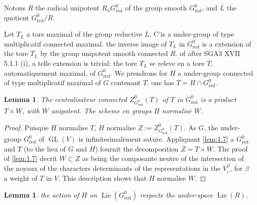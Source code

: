 \documentclass[11pt,a4paper]{article}
\theoremstyle{plain}
\newtheorem{lemma}[theorem]{Lemma}
\theoremstyle{definition}
\DeclareMathOperator{\Lie}{Lie}
\DeclareMathOperator{\GL}{GL}
\newcommand{\red}{\mathrm{r\acute{e}d}}
\begin{document}
Notons $R$ the radical unipotent $R_u G^0_\red$ of the group smooth $G^0_\red$, and $L$ the quotient $G^0_\red/R$.

Let $T_L$ a tore maximal of the group reductive $L$. C'is a under-group of type multiplicatif connected maximal. the inverse image of $T_L$ in $G^0_\red$ is a extension of the tore $T_L$ by the group unipotent smooth connected $R$. of after SGA3 XVII 5.1.1 (i), a telle extension is trivial: the tore $T_L$ se releve en a tore $T$, automatiquement maximal, of $G^0_\red$. We prendrons for $H$ a under-group connected of type multiplicatif maximal of $G$ contenant $T$. one has $T = H \cap G^0_\red$.

\begin{lemma}\label{lem:1.21}
The centralisateur connected $Z^0_{G^0_\red}(T)$ of $T$ in $G^0_\red$ is a product $T \times W$, with $W$ unipotent. The scheme en groups $H$ normalise $W$.
\end{lemma}

\begin{proof}
Puisque $H$ normalise $T$, $H$ normalise $Z := Z^0_{G^0_\red}(T)$. As $G$, the under-group $G^0_\red$ of $\GL(V)$ is infinitesimalement sature. Appliquant \ref{lem:1.7} a $G^0_\red$ and $T$ (to the lieu of $G$ and $H$) fournit the decomposition $Z = T \times W$. The proof of \ref{lem:1.7} decrit $W \subset Z$ as being the composante neutre of the intersection of the noyaux of the characters determinants of the representations in the $V_i^\beta$, for $\beta$ a weight of $T$ in $V$. This description shows that $H$ normalise $W$.
\end{proof}

\begin{lemma}\label{lem:1.22}
the action of $H$ on $\Lie(G^0_\red)$ respecte the under-space $\Lie(R)$.
\end{lemma}
\end{document}

